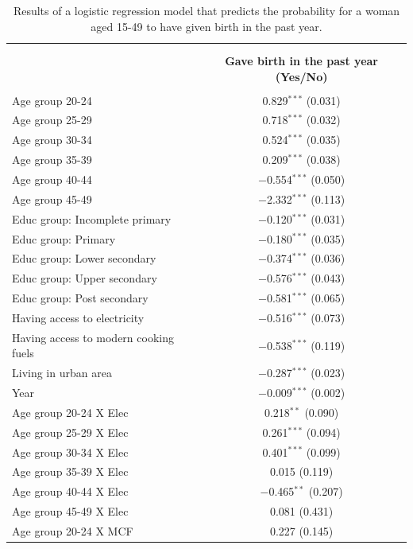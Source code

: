 \documentclass[
]{article}
\begin{document}
\begin{table}[!htbp] \centering 
  \caption{Results of a logistic regression model that predicts the probability for a woman aged 15-49 to have given birth in the past year.} 
  \label{tab:table-result1} 
\small 
\begin{tabular}{@{\extracolsep{5pt}}lc} 
\\[-1.8ex]\hline \\[-1.8ex] 
\\[-1.8ex] & \textbf{Gave birth in the past year (Yes/No)} \\ 
\hline \\[-1.8ex] 
 Age group 20-24 & 0.829$^{***}$ (0.031) \\ 
  Age group 25-29 & 0.718$^{***}$ (0.032) \\ 
  Age group 30-34 & 0.524$^{***}$ (0.035) \\ 
  Age group 35-39 & 0.209$^{***}$ (0.038) \\ 
  Age group 40-44 & $-$0.554$^{***}$ (0.050) \\ 
  Age group 45-49 & $-$2.332$^{***}$ (0.113) \\ 
  Educ group: Incomplete primary & $-$0.120$^{***}$ (0.031) \\ 
  Educ group: Primary & $-$0.180$^{***}$ (0.035) \\ 
  Educ group: Lower secondary & $-$0.374$^{***}$ (0.036) \\ 
  Educ group: Upper secondary & $-$0.576$^{***}$ (0.043) \\ 
  Educ group: Post secondary & $-$0.581$^{***}$ (0.065) \\ 
  Having access to electricity & $-$0.516$^{***}$ (0.073) \\ 
  Having  access to modern cooking fuels & $-$0.538$^{***}$ (0.119) \\ 
  Living in urban area & $-$0.287$^{***}$ (0.023) \\ 
  Year & $-$0.009$^{***}$ (0.002) \\ 
  Age group 20-24 X Elec & 0.218$^{**}$ (0.090) \\ 
  Age group 25-29 X Elec & 0.261$^{***}$ (0.094) \\ 
  Age group 30-34 X Elec & 0.401$^{***}$ (0.099) \\ 
  Age group 35-39 X Elec & 0.015 (0.119) \\ 
  Age group 40-44 X Elec & $-$0.465$^{**}$ (0.207) \\ 
  Age group 45-49 X Elec & 0.081 (0.431) \\ 
  Age group 20-24 X MCF & 0.227 (0.145) \\ 

\end{tabular}
\end{table}
\end{document}
